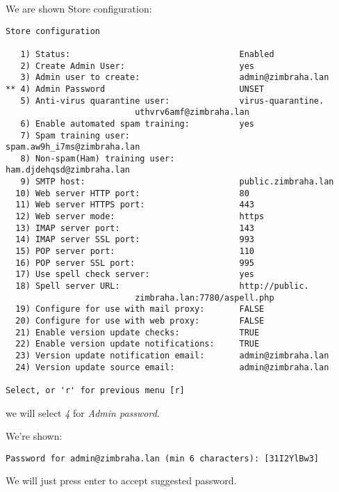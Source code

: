 We are shown Store configuration:
\begin{verbatim}
Store configuration

   1) Status:                                  Enabled                       
   2) Create Admin User:                       yes                           
   3) Admin user to create:                    admin@zimbraha.lan            
** 4) Admin Password                           UNSET                         
   5) Anti-virus quarantine user:              virus-quarantine.
						  uthvrv6amf@zimbraha.lan
   6) Enable automated spam training:          yes                           
   7) Spam training user:                      spam.aw9h_i7ms@zimbraha.lan   
   8) Non-spam(Ham) training user:             ham.djdehqsd@zimbraha.lan     
   9) SMTP host:                               public.zimbraha.lan           
  10) Web server HTTP port:                    80                            
  11) Web server HTTPS port:                   443                           
  12) Web server mode:                         https                         
  13) IMAP server port:                        143                           
  14) IMAP server SSL port:                    993                           
  15) POP server port:                         110                           
  16) POP server SSL port:                     995                           
  17) Use spell check server:                  yes                           
  18) Spell server URL:                        http://public.
						  zimbraha.lan:7780/aspell.php
  19) Configure for use with mail proxy:       FALSE                         
  20) Configure for use with web proxy:        FALSE                         
  21) Enable version update checks:            TRUE                          
  22) Enable version update notifications:     TRUE                          
  23) Version update notification email:       admin@zimbraha.lan            
  24) Version update source email:             admin@zimbraha.lan            

Select, or 'r' for previous menu [r] 
\end{verbatim}
we will select \textit{4} for \textit{Admin password}.

We're shown:
\begin{verbatim}
Password for admin@zimbraha.lan (min 6 characters): [31I2YlBw3]
\end{verbatim}

We will just press enter to accept suggested password.


